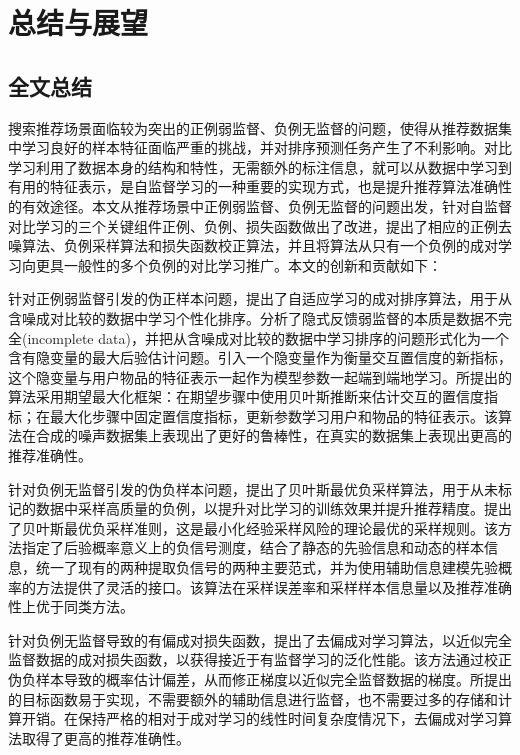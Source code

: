 
\chapter{总结与展望}
\label{cha:conclusion}

\section{全文总结}
\label{sec:conclusion}
搜索推荐场景面临较为突出的正例弱监督、负例无监督的问题，使得从推荐数据集中学习良好的样本特征面临严重的挑战，并对排序预测任务产生了不利影响。对比学习利用了数据本身的结构和特性，无需额外的标注信息，就可以从数据中学习到有用的特征表示，是自监督学习的一种重要的实现方式，也是提升推荐算法准确性的有效途径。本文从推荐场景中正例弱监督、负例无监督的问题出发，针对自监督对比学习的三个关键组件正例、负例、损失函数做出了改进，提出了相应的正例去噪算法、负例采样算法和损失函数校正算法，并且将算法从只有一个负例的成对学习向更具一般性的多个负例的对比学习推广。本文的创新和贡献如下：

针对正例弱监督引发的伪正样本问题，提出了自适应学习的成对排序算法，用于从含噪成对比较的数据中学习个性化排序。分析了隐式反馈弱监督的本质是数据不完全(incomplete data)，并把从含噪成对比较的数据中学习排序的问题形式化为一个含有隐变量的最大后验估计问题。引入一个隐变量作为衡量交互置信度的新指标，这个隐变量与用户物品的特征表示一起作为模型参数一起端到端地学习。所提出的算法采用期望最大化框架：在期望步骤中使用贝叶斯推断来估计交互的置信度指标；在最大化步骤中固定置信度指标，更新参数学习用户和物品的特征表示。该算法在合成的噪声数据集上表现出了更好的鲁棒性，在真实的数据集上表现出更高的推荐准确性。

针对负例无监督引发的伪负样本问题，提出了贝叶斯最优负采样算法，用于从未标记的数据中采样高质量的负例，以提升对比学习的训练效果并提升推荐精度。提出了贝叶斯最优负采样准则，这是最小化经验采样风险的理论最优的采样规则。该方法指定了后验概率意义上的负信号测度，结合了静态的先验信息和动态的样本信息，统一了现有的两种提取负信号的两种主要范式，并为使用辅助信息建模先验概率的方法提供了灵活的接口。该算法在采样误差率和采样样本信息量以及推荐准确性上优于同类方法。

针对负例无监督导致的有偏成对损失函数，提出了去偏成对学习算法，以近似完全监督数据的成对损失函数，以获得接近于有监督学习的泛化性能。该方法通过校正伪负样本导致的概率估计偏差，从而修正梯度以近似完全监督数据的梯度。所提出的目标函数易于实现，不需要额外的辅助信息进行监督，也不需要过多的存储和计算开销。在保持严格的相对于成对学习的线性时间复杂度情况下，去偏成对学习算法取得了更高的推荐准确性。

